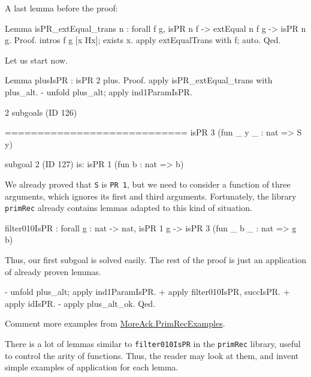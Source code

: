 A last lemma before the proof:

\begin{Coqsrc}
Lemma isPR_extEqual_trans n : forall f g, isPR n f ->
                                    extEqual n f g ->
                                    isPR n g.
Proof.
 intros f g [x Hx]; exists x.
 apply extEqualTrans with f; auto.
Qed.
\end{Coqsrc}

Let us start now.

\begin{Coqsrc}
Lemma plusIsPR : isPR 2 plus.
Proof.
  apply isPR_extEqual_trans with plus_alt.
  - unfold plus_alt; apply ind1ParamIsPR.
\end{Coqsrc}

\begin{Coqanswer}
2 subgoals (ID 126)
  
  ============================
  isPR 3 (fun _ y _ : nat => S y)

subgoal 2 (ID 127) is:
 isPR 1 (fun b : nat => b)
\end{Coqanswer}

We already proved that \texttt{S} is \texttt{PR 1}, but we need to consider a function of three arguments, which ignores its first and third arguments.
Fortunately, the library \texttt{primRec} already contains lemmas adapted to this kind of situation.

\begin{Coqanswer}
filter010IsPR :
forall g : nat -> nat, isPR 1 g -> isPR 3 (fun _ b _ : nat => g b)
\end{Coqanswer}

Thus, our first subgoal is solved easily. The rest of the proof 
is just an application of already proven lemmas.


\begin{Coqsrc}
 - unfold plus_alt; apply ind1ParamIsPR.
    + apply filter010IsPR, succIsPR.
    + apply idIsPR.
  - apply plus_alt_ok. 
Qed.
\end{Coqsrc}


\begin{todo}
Comment more examples from   \href{../theories/html/hydras.MoreAck.PrimRecExamples.html}{MoreAck.PrimRecExamples}.
\end{todo}

\begin{exercise}
There is a lot of lemmas similar to \texttt{filter010IsPR} in the \texttt{primRec} library, useful to control the arity of functions.
Thus, the reader may look at them, and invent simple examples of application for each lemma.
\end{exercise}

